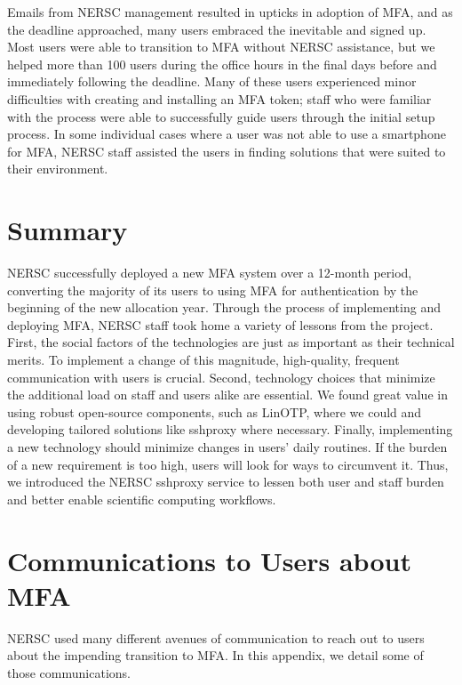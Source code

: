 \documentclass[sigconf,review]{acmart}
\begin{document}
Emails from NERSC management resulted in upticks in adoption of MFA, and as the
deadline approached, many users embraced the inevitable and signed up. Most
users were able to transition to MFA without NERSC assistance, but we helped
more than 100 users during the office hours in the final days before and
immediately following the deadline. Many of these users experienced minor
difficulties with creating and installing an MFA token; staff who were
familiar with the process were able to successfully guide users through the
initial setup process. In some individual cases where a user was not able to
use a smartphone for MFA, NERSC staff assisted the users in finding solutions
that were suited to their environment.

\section{Summary}
\label{summary}

NERSC successfully deployed a new MFA system over a 12-month period, converting
the majority of its users to using MFA for authentication by the beginning of
the new allocation year. Through the process of implementing and deploying MFA,
NERSC staff took home a variety of lessons from the project. First, the social
factors of the technologies are just as important as their technical merits. To
implement a change of this magnitude, high-quality, frequent communication with
users is crucial. Second, technology choices that minimize the additional load
on staff and users alike are essential. We found great value in using robust 
open-source components, such as LinOTP, where we could and developing tailored
solutions like sshproxy where necessary. Finally, implementing a new technology
should minimize changes in users' daily routines. If the burden of a new
requirement is too high, users will look for ways to circumvent it. Thus, we
introduced the NERSC sshproxy service to lessen both user and staff burden and
better enable scientific computing workflows.




\appendix

\section{Communications to Users about MFA}
\label{comms}
NERSC used many different avenues of communication to reach out to users about
the impending transition to MFA. In this appendix, we detail some of those
communications.
\end{document}
